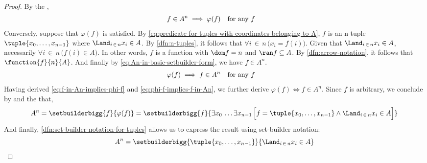 \begin{proof}
    By the ,
    \begin{equation}
        \label{eq:f-in-An-implies-phi-f}
        \begin{aligned}
            f \in A^{n} \implies \varphi(f)&
        \end{aligned}
        \begin{aligned}
            &\text{for any \( f \)}
        \end{aligned}
    \end{equation}
    Conversely, suppose that \( \varphi(f) \) is satisfied. By \eqref{eq:predicate-for-tuples-with-coordinates-belonging-to-A},
    \( f \) is an n-tuple \( \tuple{x_{0}, \dots, x_{n-1}} \) where \( \Land_{i \,\in\, n} x_{i} \in A \).
    By \cref{dfn:n-tuples}, it follows that \( \forall i\,{\in}\,n \, \big( x_{i} = f(i) \big) \).
    Given that \( \Land_{i \,\in\, n} x_{i} \in A \), necessarily \( \forall i\,{\in}\,n \, \big( f(i) \in A \big) \).
    In other words, \( f \) is a function with \( \dom f = n \) and \( \ran f \subseteq A \).
    By \cref{dfn:arrow-notation}, it follows that \( \function{f}{n}{A} \). And finally by \eqref{eq:An-in-basic-setbuilder-form},
    we have \( f \in A^{n} \).
    \begin{equation}
        \label{eq:phi-f-implies-f-in-An}
        \begin{aligned}
            \varphi(f) \implies f \in A^{n}&
        \end{aligned}
        \begin{aligned}
            &\text{for any \( f \)}
        \end{aligned}
    \end{equation}
    Having derived \eqref{eq:f-in-An-implies-phi-f} and \eqref{eq:phi-f-implies-f-in-An}, we further derive 
    \( \varphi(f) \iff f \in A^{n} \). Since \( f \) is arbitrary, we conclude by
     and the  that,
    \begin{equation*}
        A^{n}
        = \setbuilderbigg{f}{\varphi(f)}
        = \setbuilderbigg{f}{\exists x_{0} \, \dots \exists x_{n-1} \, \Big[ f = \tuple{x_{0}, \dots, x_{n-1}} \land \Land_{i \,\in\, n} x_{i} \in A \Big]}
    \end{equation*}
    And finally, \cref{dfn:set-builder-notation-for-tuples} allows us to express the result using set-builder notation:
    \begin{equation*}
        A^{n} = \setbuilderbigg{\tuple{x_{0}, \dots, x_{n-1}}}{\Land_{i \,\in\, n} x_{i} \in A} \qedhere
    \end{equation*}
\end{proof}

